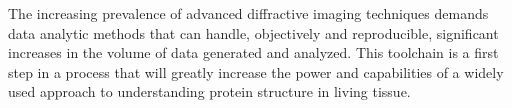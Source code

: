 \documentclass{sig-alternate}
\begin{document}
The increasing prevalence of advanced diffractive imaging techniques
demands data analytic methods that can handle, objectively and
reproducible, significant increases in the volume of data generated
and analyzed. This toolchain is a first step in a process that will
greatly increase the power and capabilities of a widely used approach
to understanding protein structure in living tissue. 

%
%


\scriptsize


\end{document}
